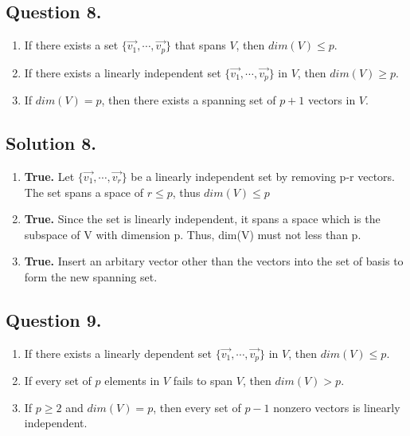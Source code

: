 \documentclass{article}
\begin{document}
\subsection*{Question 8.}
\begin{enumerate}
    \item If there exists a set $\{\Vec{v_1},\cdots , \Vec{v_p}\}$ that spans $V$, then $dim(V)\leq p$.
    \item If there exists a linearly independent set $\{\Vec{v_1},\cdots , \Vec{v_p}\}$ in $V$, then $dim(V)\geq p$.
    \item If $dim(V)= p$, then there exists a spanning set of $p+1$ vectors in $V$.
\end{enumerate}
\subsection*{Solution 8.}
\begin{enumerate}
    \item \textbf{True.} Let $\{\Vec{v_1},\cdots , \Vec{v_r}\}$ be a linearly independent set by removing p-r vectors. The set spans a space of $r\leq p$, thus $dim(V) \leq p$
    \item \textbf{True.} Since the set is linearly independent, it spans a space which is the subspace of V with dimension p. Thus, dim(V) must not less than p.
    \item \textbf{True.} Insert an arbitary vector other than the vectors into the set of basis to form the new spanning set. 
\end{enumerate}
\subsection*{Question 9.}
\begin{enumerate}
    \item If there exists a linearly dependent set $\{\Vec{v_1},\cdots , \Vec{v_p}\}$ in $V$, then $dim(V)\leq p$.
    \item If every set of $p$ elements in $V$ fails to span $V$, then $dim(V)>p$.
    \item If $p\geq 2$ and $dim(V)=p$, then every set of $p-1$ nonzero vectors is linearly independent.
\end{enumerate}
\end{document}
